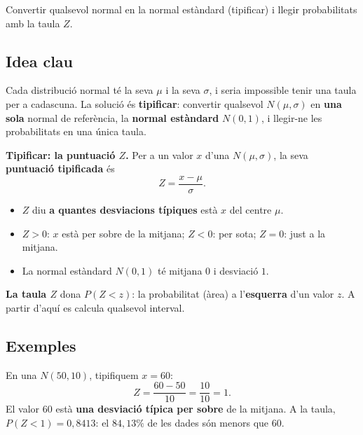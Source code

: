 %
{Convertir qualsevol normal en la normal estàndard (tipificar) i llegir probabilitats amb la taula $Z$.}

\subsection{Idea clau}

Cada distribució normal té la seva $\mu$ i la seva $\sigma$, i seria impossible tenir una
taula per a cadascuna. La solució és \textbf{tipificar}: convertir qualsevol
$N(\mu,\sigma)$ en \textbf{una sola} normal de referència, la \textbf{normal estàndard}
$N(0,1)$, i llegir-ne les probabilitats en una única taula.

\begin{idea}
\textbf{Tipificar: la puntuació $Z$.} Per a un valor $x$ d'una $N(\mu,\sigma)$, la seva
\textbf{puntuació tipificada} és
\[
Z=\frac{x-\mu}{\sigma}.
\]
\begin{itemize}[leftmargin=1.4em, itemsep=2pt]
  \item $Z$ diu \textbf{a quantes desviacions típiques} està $x$ del centre $\mu$.
  \item $Z>0$: $x$ està per sobre de la mitjana; $Z<0$: per sota; $Z=0$: just a la
        mitjana.
  \item La normal estàndard $N(0,1)$ té mitjana $0$ i desviació $1$.
\end{itemize}
\textbf{La taula $Z$} dona $P(Z<z)$: la probabilitat (àrea) a l'\textbf{esquerra} d'un
valor $z$. A partir d'aquí es calcula qualsevol interval.
\end{idea}

\subsection{Exemples}

\begin{exemple}
En una $N(50,10)$, tipifiquem $x=60$:
\[
Z=\frac{60-50}{10}=\frac{10}{10}=1.
\]
El valor $60$ està \textbf{una desviació típica per sobre} de la mitjana. A la taula,
$P(Z<1)=0,8413$: el $84,13\%$ de les dades són menors que $60$.
\end{exemple}

